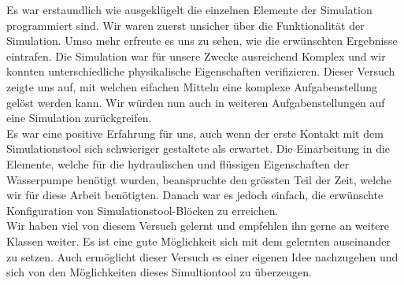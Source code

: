 Es war erstaundlich wie ausgeklügelt die einzelnen Elemente der Simulation programmiert sind. Wir waren zuerst unsicher über die Funktionalität der Simulation. Umso mehr erfreute es uns zu sehen, wie die erwünschten Ergebnisse eintrafen. Die Simulation war für unsere Zwecke ausreichend Komplex und wir konnten unterschiedliche physikalische Eigenschaften verifizieren. Dieser Versuch zeigte uns auf, mit welchen eifachen Mitteln eine komplexe Aufgabenstellung gelöst werden kann. Wir würden nun auch in weiteren Aufgabenstellungen auf eine Simulation zurückgreifen.\\

Es war eine positive Erfahrung für uns, auch wenn der erste Kontakt mit dem Simulationstool sich schwieriger gestaltete als erwartet. Die Einarbeitung in die Elemente, welche für die hydraulischen und flüssigen Eigenschaften der Wasserpumpe benötigt wurden, beanspruchte den grössten Teil der Zeit, welche wir für diese Arbeit benötigten. Danach war es jedoch einfach, die erwünschte Konfiguration von Simulationstool-Blöcken zu erreichen.\\

Wir haben viel von diesem Versuch gelernt und empfehlen ihn gerne an weitere Klassen weiter. Es ist eine gute Möglichkeit sich mit dem gelernten auseinander zu setzen. Auch ermöglicht dieser Versuch es einer eigenen Idee nachzugehen und sich von den Möglichkeiten dieses Simultiontool zu überzeugen.

